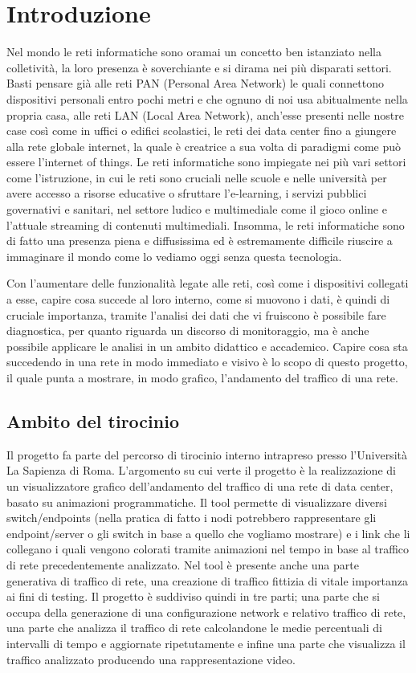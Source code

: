 \documentclass[binding=0.6cm]{sapthesis}
\begin{document}
\chapter{Introduzione}
Nel mondo le reti informatiche sono oramai un concetto ben istanziato 
nella colletività, la loro presenza è soverchiante e si dirama nei più disparati settori.
Basti pensare già alle  reti PAN (Personal Area Network) le quali connettono dispositivi
personali entro pochi metri e che ognuno di noi usa abitualmente nella propria casa, 
alle reti LAN (Local Area Network), 
anch'esse presenti
nelle nostre case così come in uffici o edifici scolastici, le reti dei data center 
fino a giungere alla rete globale internet, la quale è creatrice a sua volta di paradigmi come
può essere l'internet of things. 
Le reti informatiche sono impiegate nei più vari 
settori come l'istruzione, in cui le reti
sono cruciali nelle scuole e nelle università per avere accesso a risorse educative o sfruttare l'e-learning, i servizi
pubblici governativi e sanitari, nel settore ludico e multimediale come il gioco online e l'attuale
streaming di contenuti multimediali. Insomma, le reti informatiche sono di fatto una presenza piena e diffusissima
ed è estremamente difficile riuscire a immaginare il mondo come lo vediamo oggi senza questa tecnologia.

Con l'aumentare delle funzionalità legate alle reti, così come i dispositivi collegati a esse, capire cosa succede al
loro interno, come si muovono i dati, è quindi di cruciale importanza, tramite l'analisi dei dati che vi fruiscono è possibile fare diagnostica, per quanto
riguarda un discorso di monitoraggio, ma è anche possibile applicare le analisi in un ambito didattico e accademico.
Capire cosa sta succedendo in una rete in modo immediato e visivo è lo scopo di questo progetto, il quale punta a mostrare,
in modo grafico, l'andamento del traffico di una rete.
\section{Ambito del tirocinio}
Il progetto fa parte del percorso di tirocinio interno intrapreso presso l'Università La Sapienza di Roma. L'argomento su cui verte il progetto
è la realizzazione di un visualizzatore grafico dell'andamento del traffico di una rete di data center, basato
su animazioni programmatiche. Il tool permette di visualizzare diversi switch/endpoints (nella pratica di fatto i nodi potrebbero rappresentare gli endpoint/server o gli switch in base a quello che vogliamo mostrare) e i link
che li collegano i quali vengono colorati tramite animazioni nel tempo in base al traffico di 
rete precedentemente analizzato. Nel tool è presente anche una parte generativa di traffico di rete,
una creazione di traffico fittizia di vitale importanza ai fini di testing. Il progetto è suddiviso quindi in tre parti; una parte
che si occupa della generazione di una configurazione network e relativo traffico di rete, 
una parte che analizza il traffico di rete
calcolandone le medie percentuali di intervalli di tempo e aggiornate ripetutamente e infine 
una parte che visualizza il traffico analizzato producendo una rappresentazione video.
\end{document}
